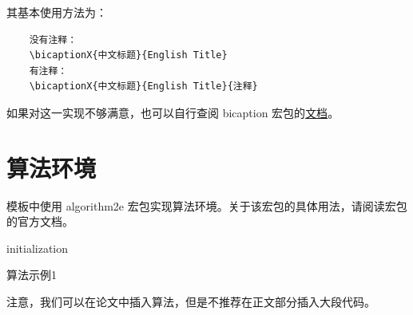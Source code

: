 其基本使用方法为：

\begin{verbatim}
	没有注释：
	\bicaptionX{中文标题}{English Title}
	有注释：
	\bicaptionX{中文标题}{English Title}{注释}	
\end{verbatim}

如果对这一实现不够满意，也可以自行查阅 bicaption 宏包的\href{https://sg.mirrors.cicku.me/ctan/macros/latex/contrib/caption/bicaption.pdf}{文档}。

\section{算法环境}
\label{sec:algorithm}
模板中使用 algorithm2e 宏包实现算法环境。关于该宏包的具体用法，请阅读宏包的官方文档。

\normalem
\begin{algorithm}[h]
	\SetAlgoLined
  
	initialization\;
	\caption{算法示例1}
	\label{algo:algorithm1}
  \end{algorithm}
  \ULforem

  注意，我们可以在论文中插入算法，但是不推荐在正文部分插入大段代码。